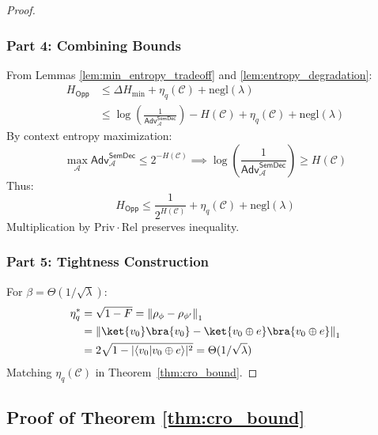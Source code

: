\documentclass[preprint,12pt]{elsarticle}
\newcommand{\negl}{\mathrm{negl}}
\newcommand{\Adv}{\mathsf{Adv}}
\begin{document}
\begin{proof}
                    \subsubsection{Part 4: Combining Bounds}
                        From Lemmas \ref{lem:min_entropy_tradeoff} and \ref{lem:entropy_degradation}:
                        \begin{align*}
                            H_{\mathsf{Opp}} &\leq \Delta H_{\text{min}} + \eta_q(\mathcal{C}) + \negl(\lambda) \\
                            &\leq \log \left( \frac{1}{\Adv^{\mathsf{SemDec}}_{\mathcal{A}}} \right) - H(\mathcal{C}) + \eta_q(\mathcal{C}) + \negl(\lambda)
                        \end{align*}
                        By context entropy maximization: 
                        \[
                        \max_{\mathcal{A}} \Adv^{\mathsf{SemDec}}_{\mathcal{A}} \leq 2^{-H(\mathcal{C})} \implies \log \left( \frac{1}{\Adv^{\mathsf{SemDec}}_{\mathcal{A}}} \right) \geq H(\mathcal{C})
                        \]
                        Thus:
                        \[
                        H_{\mathsf{Opp}} \leq \frac{1}{2^{H(\mathcal{C})}} + \eta_q(\mathcal{C}) + \negl(\lambda)
                        \]
                        Multiplication by $\mathrm{Priv} \cdot \mathrm{Rel}$ preserves inequality.

                    \subsubsection{Part 5: Tightness Construction}
                        For $\beta = \Theta(1/\sqrt{\lambda})$: %
                        \begin{align*}
                            \eta_q^* &= \sqrt{1 - F} = \left\| \rho_{\phi} - \rho_{\phi'} \right\|_1 \\
                            &= \left\| \ket{v_0}\bra{v_0} - \ket{v_0 \oplus e}\bra{v_0 \oplus e} \right\|_1 \\
                            &= 2\sqrt{1 - |\langle v_0 | v_0 \oplus e\rangle|^2} = \Theta(1/\sqrt{\lambda})
                        \end{align*}
                        Matching $\eta_q(\mathcal{C})$ in Theorem~\ref{thm:cro_bound}.
                \end{proof}

            \subsection{Proof of Theorem \ref{thm:cro_bound}}\label{app:A.3_proof_thm_cro_bound}
\end{document}
